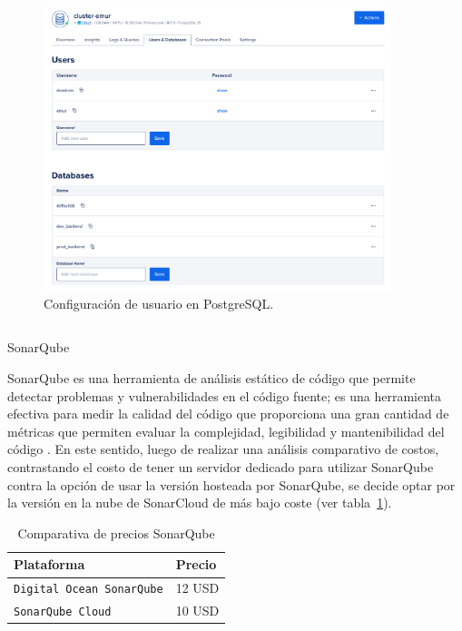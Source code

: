 \begin{figure}[h]
    \centering
    \includegraphics[width=0.9\textwidth]{img/infraestructura/cluster-db-digital-ocean.png}
    \caption{Configuración de usuario en PostgreSQL.} \label{Img:Configuración+de+usuario+en PostgreSQL}
\end{figure} 


\subsection{}{SonarQube}

SonarQube es una herramienta de análisis estático de código que permite detectar problemas y vulnerabilidades en el código fuente; es una herramienta efectiva para medir la calidad del código que proporciona una gran cantidad de métricas que permiten evaluar la complejidad, legibilidad y mantenibilidad del código \cite{web:sonarqube}. En este sentido, luego de realizar una análisis comparativo de costos, contrastando el costo de tener un servidor dedicado para utilizar SonarQube contra la opción de usar la versión hosteada por SonarQube, se decide optar por la versión en la nube de SonarCloud de más bajo coste (ver tabla~\ref{tab:requisitos-sonar}).

\begin{table}[H]
\centering
\begin{tabular}{ll}
\toprule
Plataforma                     & Precio                           \\
\midrule
\texttt{Digital Ocean SonarQube}       & 12 USD              \\
\texttt{SonarQube Cloud}      & 10 USD             \\
\bottomrule
\end{tabular}
\caption{Comparativa de precios SonarQube}
\label{tab:requisitos-sonar}
\end{table}

